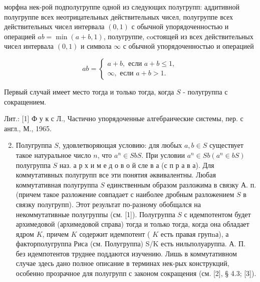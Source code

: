 \documentclass[10pt]{article}
\begin{document}
морфна нек-рой подполугруппе одной из следующих полугрупп: аддитивной полугруппе всех неотрицательных действительных чисел, полугруппе всех действительных чисел интервала $(0,1)$ с обычной упорядоченностью и операцией $a b=\min (a+b, 1)$, полугруппе, coстоящей из всех действительных чисел интервала $(0,1)$ и символа $\infty$ с обычной упорядоченностью и операцией



\[

a b=\left\{\begin{array}{c}

a+b, \text { если } a+b \leqslant 1, \\

\infty, \text { если } a+b>1 .

\end{array}\right.

\]



Первый случай имеет место тогда и только тогда, когда $S$ - полугруппа с сокращением.



Лит.: [1] Ф у к с Л., Частично упорядоченные алгебраические системы, пер. с англ., М., 1965.



\begin{enumerate}

  \setcounter{enumi}{1}

  \item Полугруппа $S$, удовлетворяющая условию: для любых $a, b \in S$ существует такое натуральное число $n$, что $a^{n} \in S b S$. При условии $a^{n} \in S b\left(a^{n} \in b S\right)$ полугруппа $S$ наз. а р х и м е д о в о й сле в а (с п р а в а). Для коммутативных полугрупп все эти понятия әквивалентны. Любая коммутативная полугруппа $S$ единственным образом разложима в связку А. п. (причем такое разложение совпадает с наиболее дробным разложением $S$ в связку полугрупп). Этот результат по-разному обобщался на некоммутативные полугруппы (см. [1]). Полугруппа $S$ с идемпотентом будет архимедовой (архимедовой справа) тогда и только тогда, когда она обладает ядром $K$, причем $K$ содержит идемпотент ( $K$ есть правая групnа), а факторполугруппа Риса (см. Полугруппа) S/K есть нильполуаруппа. А. П. без идемпотентов труднее поддаются изучению. Лишь в коммутативном случае здесь дано полное описание в терминах нек-рых конструкций, особенно прозрачное для полугрупп с законом сокращения (см. [2], § 4.3; [3]).

\end{enumerate}
\end{document}
